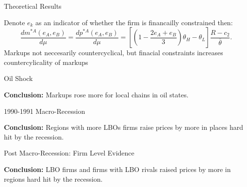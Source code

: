 \documentclass[aspectratio=169]{beamer}
\begin{document}
\begin{frame}{Theoretical Results}
    
    \begin{center}
        \centering
        \resizebox{!}{0.58\textheight}{}
    \end{center}
    
    \vspace{0.1cm}

    Denote $e_k$ as an indicator of whether the firm is financailly constrained then:
    \small
    \[\frac{d m^{*A}(e_A,e_B)}{d\mu}=\frac{d p^{*A}(e_A,e_B)}{d\mu}=\left[\left(1-\frac{2e_A+e_B}{3}\right)\theta_H-\theta_L\right]\frac{R-c_2}{\bar{\theta}}.\]
    Markups not neccesarily countercyclical, but finacial constraints increases countercylicality of markups
\end{frame}

\begin{frame}{Oil Shock}
    \label{tab:oil-shock}
    \begin{center}
        
    \end{center}
    \vspace{0.3cm}
    \textbf{Conclusion:} Markups rose more for local chains in oil states.
\end{frame}

\begin{frame}[shrink=8]{1990-1991 Macro-Recession}
    \label{tab:macro-recession}
    \begin{center}
        
    \end{center}
    \vspace{0.3cm}
    \textbf{Conclusion:} Regions with more LBOs firms raise prices by more in places hard hit by the recession.
\end{frame}

\begin{frame}[shrink=12]{Post Macro-Recession: Firm Level Evidence}
    \label{tab:post-macro-firm-level}
    \begin{center}
        
    \end{center}
    \vspace{0.1cm}
    \textbf{Conclusion:} LBO firms and firms with LBO rivals raised prices by more in regions hard hit by the recession.
\end{frame}
\end{document}
